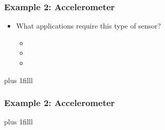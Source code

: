 \documentclass[fleqn]{beamer} %
\newcommand{\sectionIIsubsectionIVtitle}{Example 2: Accelerometer}
\newcommand{\btVFill}{\vskip0pt plus 1filll}
\begin{document}
			\begin{frame}
				\frametitle{\sectionIIsubsectionIVtitle}

				\begin{itemize}
					\item What applications require this type of sensor?
					\begin{itemize}
						\item \vspace{5mm}
						\item \vspace{5mm}
						\item \vspace{5mm}	
					\end{itemize}
				\end{itemize}

				\btVFill	

			\end{frame}

			\begin{frame}
				\frametitle{\sectionIIsubsectionIVtitle}



				\btVFill	

			\end{frame}
		
	
\end{document}
